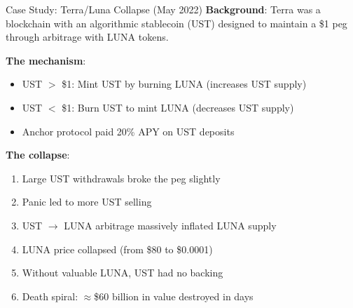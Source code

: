 \documentclass[10pt]{beamer}
\begin{document}
\begin{frame}{Case Study: Terra/Luna Collapse (May 2022)}
  \textbf{Background}: Terra was a blockchain with an algorithmic stablecoin (UST) designed to maintain a \$1 peg through arbitrage with LUNA tokens.
  
  \vspace{0.5em}
  \textbf{The mechanism}:
  \begin{itemize}
    \item UST $>$ \$1: Mint UST by burning LUNA (increases UST supply)
    \item UST $<$ \$1: Burn UST to mint LUNA (decreases UST supply)
    \item Anchor protocol paid 20\% APY on UST deposits
  \end{itemize}
  
  \vspace{0.5em}
  \textbf{The collapse}:
  \begin{enumerate}
    \item Large UST withdrawals broke the peg slightly
    \item Panic led to more UST selling
    \item UST $\rightarrow$ LUNA arbitrage massively inflated LUNA supply
    \item LUNA price collapsed (from \$80 to \$0.0001)
    \item Without valuable LUNA, UST had no backing
    \item Death spiral: $\approx$\$60 billion in value destroyed in days
  \end{enumerate}
\end{frame}
\end{document}
